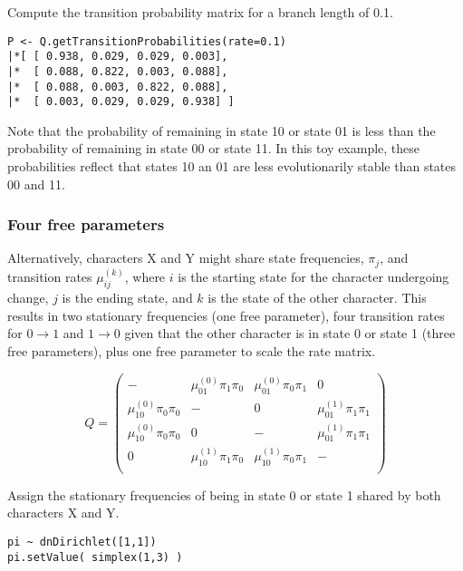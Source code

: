 Compute the transition probability matrix for a branch length of 0.1.

{\tt \begin{snugshade*}
\begin{lstlisting}
P <- Q.getTransitionProbabilities(rate=0.1)
|*[ [ 0.938, 0.029, 0.029, 0.003],
|*  [ 0.088, 0.822, 0.003, 0.088],
|*  [ 0.088, 0.003, 0.822, 0.088],
|*  [ 0.003, 0.029, 0.029, 0.938] ]
\end{lstlisting}
\end{snugshade*}}

Note that the probability of remaining in state 10 or state 01 is less than the probability of remaining in state 00 or state 11.
In this toy example, these probabilities reflect that states 10 an 01 are less evolutionarily stable than states 00 and 11.

\subsubsection{Four free parameters}

Alternatively, characters X and Y might share state frequencies, $\pi_j$, and transition rates $\mu_{ij}^{(k)}$, where $i$ is the starting state for the character undergoing change, $j$ is the ending state, and $k$ is the state of the other character.
This results in two stationary frequencies (one free parameter), four transition rates for $0 \rightarrow 1$ and $1 \rightarrow 0$ given that the other character is in state 0 or state 1 (three free parameters), plus one free parameter to scale the rate matrix.

\begin{equation*}
Q = \begin{pmatrix}
- & \mu_{01}^{(0)} \pi_1 \pi_0 & \mu_{01}^{(0)} \pi_0 \pi_1 & 0 \\
\mu_{10}^{(0)} \pi_0 \pi_0 & -   & 0 & \mu_{01}^{(1)} \pi_1 \pi_1 \\
\mu_{10}^{(0)} \pi_0 \pi_0 & 0   & - & \mu_{01}^{(1)} \pi_1 \pi_1 \\
0 & \mu_{10}^{(1)} \pi_1 \pi_0 & \mu_{10}^{(1)} \pi_0 \pi_1 & - \\
\end{pmatrix}
\end{equation*}

Assign the stationary frequencies of being in state 0 or state 1 shared by both characters X and Y.

{\tt \begin{snugshade*}
\begin{lstlisting}
pi ~ dnDirichlet([1,1])
pi.setValue( simplex(1,3) )
\end{lstlisting}
\end{snugshade*}}

